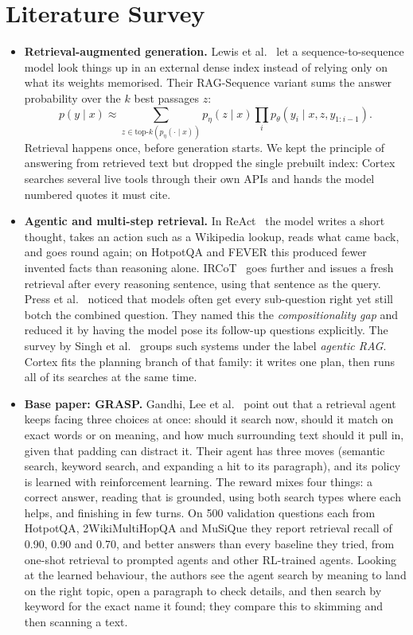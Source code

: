 \documentclass[oneside,a4paper,12pt]{report}
\begin{document}
\section{Literature Survey}
\begin{itemize}
\item \textbf{Retrieval-augmented generation.} Lewis et al.~\cite{lewis2020rag} let a sequence-to-sequence model look things up in an external dense index instead of relying only on what its weights memorised. Their RAG-Sequence variant sums the answer probability over the $k$ best passages $z$:
\[ p(y \mid x) \approx \sum_{z \in \mathrm{top}\mbox{-}k(p_\eta(\cdot \mid x))} p_\eta(z \mid x) \prod_{i} p_\theta(y_i \mid x, z, y_{1:i-1}). \]
Retrieval happens once, before generation starts. We kept the principle of answering from retrieved text but dropped the single prebuilt index: Cortex searches several live tools through their own APIs and hands the model numbered quotes it must cite.

\item \textbf{Agentic and multi-step retrieval.} In ReAct~\cite{yao2023react} the model writes a short thought, takes an action such as a Wikipedia lookup, reads what came back, and goes round again; on HotpotQA and FEVER this produced fewer invented facts than reasoning alone. IRCoT~\cite{trivedi2023ircot} goes further and issues a fresh retrieval after every reasoning sentence, using that sentence as the query. Press et al.~\cite{press2023selfask} noticed that models often get every sub-question right yet still botch the combined question. They named this the \emph{compositionality gap} and reduced it by having the model pose its follow-up questions explicitly. The survey by Singh et al.~\cite{singh2025agenticrag} groups such systems under the label \emph{agentic RAG}. Cortex fits the planning branch of that family: it writes one plan, then runs all of its searches at the same time.

\item \textbf{Base paper: GRASP.} Gandhi, Lee et al.~\cite{grasp2026} point out that a retrieval agent keeps facing three choices at once: should it search now, should it match on exact words or on meaning, and how much surrounding text should it pull in, given that padding can distract it. Their agent has three moves (semantic search, keyword search, and expanding a hit to its paragraph), and its policy is learned with reinforcement learning. The reward mixes four things: a correct answer, reading that is grounded, using both search types where each helps, and finishing in few turns. On 500 validation questions each from HotpotQA, 2WikiMultiHopQA and MuSiQue they report retrieval recall of 0.90, 0.90 and 0.70, and better answers than every baseline they tried, from one-shot retrieval to prompted agents and other RL-trained agents. Looking at the learned behaviour, the authors see the agent search by meaning to land on the right topic, open a paragraph to check details, and then search by keyword for the exact name it found; they compare this to skimming and then scanning a text.


\end{itemize}
\end{document}
